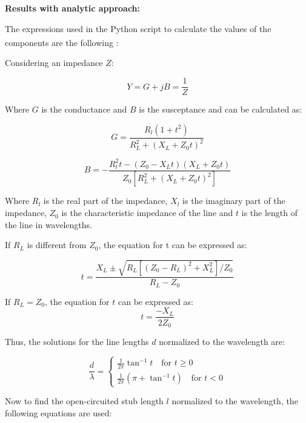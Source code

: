 \vspace{0.4cm}
\textbf{Results with analytic approach:}
\vspace{0.4cm}

The expressions used in the Python script to calculate the values of the components are the following \textsuperscript{\cite{Pozar}}:

Considering an impedance $Z$:

\begin{equation}
    Y = G + jB = \frac{1}{Z}
\end{equation}

Where $G$ is the conductance and $B$ is the susceptance and can be calculated as:

\begin{equation}
    G = \frac{R_l(1+t^2)}{R_L^2 + (X_L +Z_0t)^2}
\end{equation}

\begin{equation}
    B = -\frac{R_l^2t-(Z_0-X_Lt)(X_L+Z_0t)}{Z_0[R_L^2 + (X_L +Z_0t)^2]}
\end{equation}

Where $R_l$ is the real part of the impedance, $X_l$ is the imaginary part of the impedance, $Z_0$ is the characteristic impedance of the line and $t$ is the length of the line in wavelengths.

If $R_L$ is different from $Z_0$, the equation for t can be expressed as:

\begin{equation}
    t = \frac{X_L \pm \sqrt{R_L[(Z_0-R_L)^2+X_L^2]/Z_0}}{R_L-Z_0}
\end{equation}

If $R_L = Z_0$, the equation for $t$ can be expressed as:
\begin{equation}
    t = \frac{-X_L}{2Z_0}
\end{equation}

Thus, the solutions for the line lengths $d$ normalized to the wavelength are:

\begin{equation}
    \frac{d}{\lambda} =
    \begin{cases}
        \frac{1}{2\pi}\tan^{-1} t \quad \text{for } t \geq 0 \\
        \frac{1}{2\pi}\left(\pi + \tan^{-1} t\right) \quad \text{for } t < 0
    \end{cases}
    \label{eq:dlength}
\end{equation}

Now to find the open-circuited stub length $l$ normalized to the wavelength, the following equations are used:

